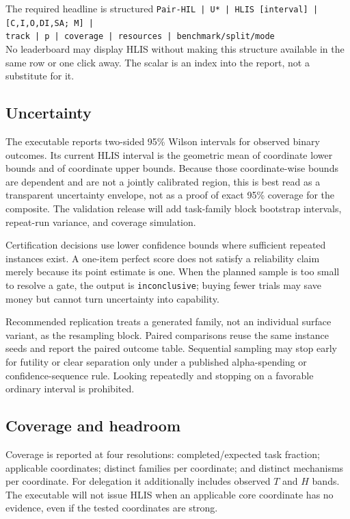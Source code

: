 \documentclass[11pt]{article}
\theoremstyle{definition}
\begin{document}
\begin{claimbox}{The required headline is structured}
\texttt{Pair-HIL | U* | HLIS [interval] | [C,I,O,DI,SA; M] |}\\
\texttt{track | p | coverage | resources | benchmark/split/mode}\\

No leaderboard may display HLIS without making this structure available in the same row or one click away. The scalar is an index into the report, not a substitute for it.
\end{claimbox}

\subsection{Uncertainty}

The executable reports two-sided 95\% Wilson intervals for observed binary outcomes. Its current HLIS interval is the geometric mean of coordinate lower bounds and of coordinate upper bounds. Because those coordinate-wise bounds are dependent and are not a jointly calibrated region, this is best read as a transparent uncertainty envelope, not as a proof of exact 95\% coverage for the composite. The validation release will add task-family block bootstrap intervals, repeat-run variance, and coverage simulation.

Certification decisions use lower confidence bounds where sufficient repeated instances exist. A one-item perfect score does not satisfy a reliability claim merely because its point estimate is one. When the planned sample is too small to resolve a gate, the output is \texttt{inconclusive}; buying fewer trials may save money but cannot turn uncertainty into capability.

Recommended replication treats a generated family, not an individual surface variant, as the resampling block. Paired comparisons reuse the same instance seeds and report the paired outcome table. Sequential sampling may stop early for futility or clear separation only under a published alpha-spending or confidence-sequence rule. Looking repeatedly and stopping on a favorable ordinary interval is prohibited.

\subsection{Coverage and headroom}

Coverage is reported at four resolutions: completed/expected task fraction; applicable coordinates; distinct families per coordinate; and distinct mechanisms per coordinate. For delegation it additionally includes observed $T$ and $H$ bands. The executable will not issue HLIS when an applicable core coordinate has no evidence, even if the tested coordinates are strong.
\end{document}

